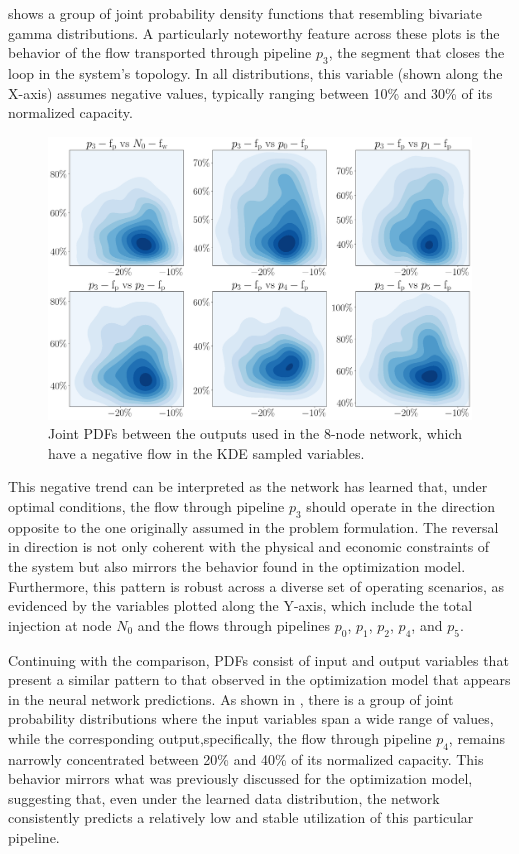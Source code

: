  shows a group of joint probability density functions that resembling bivariate gamma distributions. A particularly noteworthy feature across these plots is the behavior of the flow transported through pipeline $p_3$, the segment that closes the loop in the system's topology. In all distributions, this variable (shown along the X-axis) assumes negative values, typically ranging between 10\% and 30\% of its normalized capacity.

\begin{figure}[htbp]
    \begin{center}
        \includegraphics[width=.65\textwidth]{figures/Chapter_NonLinealCensnet/outputs_outputs_2 (KDE).png}
    \end{center}
    \caption{Joint PDFs between the outputs used in the 8-node network, which have a negative flow in the KDE sampled variables.}
    \label{fig:joint_distributions_output_output_2_KDE}
\end{figure}
 

This negative trend can be interpreted as the network has learned that, under optimal conditions, the flow through pipeline $p_3$ should operate in the direction opposite to the one originally assumed in the problem formulation. The reversal in direction is not only coherent with the physical and economic constraints of the system but also mirrors the behavior found in the optimization model. Furthermore, this pattern is robust across a diverse set of operating scenarios, as evidenced by the variables plotted along the Y-axis, which include the total injection at node $N_0$ and the flows through pipelines $p_0$, $p_1$, $p_2$, $p_4$, and $p_5$. 


Continuing with the comparison, PDFs consist of input and output variables that present a similar pattern to that observed in the optimization model that appears in the neural network predictions. As shown in , there is a group of joint probability distributions where the input variables span a wide range of values, while the corresponding output,specifically, the flow through pipeline $p_4$, remains narrowly concentrated between 20\% and 40\% of its normalized capacity. This behavior mirrors what was previously discussed for the optimization model, suggesting that, even under the learned data distribution, the network consistently predicts a relatively low and stable utilization of this particular pipeline.


